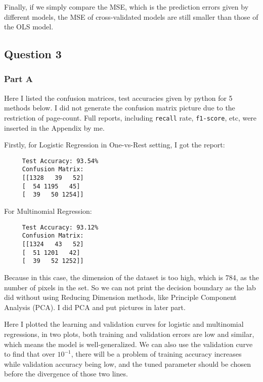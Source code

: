\documentclass[letterpaper]{article}
\begin{document}
      Finally, if we simply compare the MSE, which is the prediction errors given by different models, the MSE of cross-validated models are still smaller than those of the OLS model. 
       
		\subsection{Question 3}
		\subsubsection{Part A}
		
		Here I listed the confusion matrices, test accuracies given by python for 5 methods below. I did not generate the confusion matrix picture due to the restriction of page-count. Full reports, including \texttt{recall} rate, \texttt{f1-score}, etc, were inserted in the Appendix by me.
		
		Firstly, for Logistic Regression in One-vs-Rest setting, I got the report:
		
		\begin{minipage}{\linewidth}
			\begin{Verbatim}
     Test Accuracy: 93.54%
     Confusion Matrix:
     [[1328   39   52]
     [  54 1195   45]
     [  39   50 1254]]
			\end{Verbatim}
		\end{minipage}
	
	 For Multinomial Regression:
	
				\begin{minipage}{\linewidth}
			\begin{Verbatim}
     Test Accuracy: 93.12%
     Confusion Matrix:
     [[1324   43   52]
     [  51 1201   42]
     [  39   52 1252]]
			\end{Verbatim}
		\end{minipage}
	
	Because in this case, the dimension of the dataset is too high, which is 784, as the number of pixels in the set. So we can not print the decision boundary as the lab did without using Reducing Dimension methods, like Principle Component Analysis (PCA). I did PCA and put pictures in later part. 
	
	 Here I plotted the learning and validation curves for logistic and multinomial regressions, in two plots, both training and validation errors are low and similar, which means the model is well-generalized. We can also use the validation curve to find that over $10^{-1}$, there will be a problem of training accuracy increases while validation accuracy being low, and the tuned parameter should be chosen before the divergence of those two lines. 
	
\end{document}

